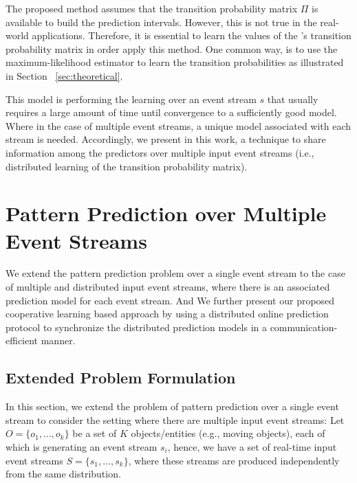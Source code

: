 \par The proposed method assumes that the transition probability matrix $\Pi$ is available to build the prediction intervals. However, this is not true in the real-world applications.
Therefore, it is essential to learn the values of the \pmcmr's transition probability matrix in order apply this method. One common way, is to use the maximum-likelihood estimator to learn the transition probabilities as illustrated in Section ~\ref{sec:theoretical}. 

\par This model is performing the learning over an event stream $s$ that  usually requires a large amount of time until convergence to a sufficiently good model.  Where in the case of multiple event streams, a unique model associated with each stream is needed. Accordingly, we present in this work, a technique to share information among the \pmcmr predictors over multiple input event streams (i.e., distributed learning of the transition probability matrix).

\section{Pattern Prediction over Multiple Event Streams}

We extend the pattern prediction problem over a single event stream to the case of multiple and distributed input event streams, where there is an associated prediction model for each event stream. And We further present our proposed cooperative learning based approach by using a distributed online prediction protocol \cite{kamp2014communication} to synchronize the distributed prediction models in a communication-efficient manner. 


\subsection{Extended Problem Formulation}

\par In this section, we extend the problem of pattern prediction over a single event stream to consider the setting where there are multiple input event streams: 
Let $O = \{ o_1, ..., o_k\}$ be a set of \emph{$K$} objects/entities (e.g., moving objects), each of which is generating an event stream $s_i$, hence, we have a set of real-time input event streams $S = \{ s_1, ..., s_k\}$, where these streams are produced independently from the same distribution.


